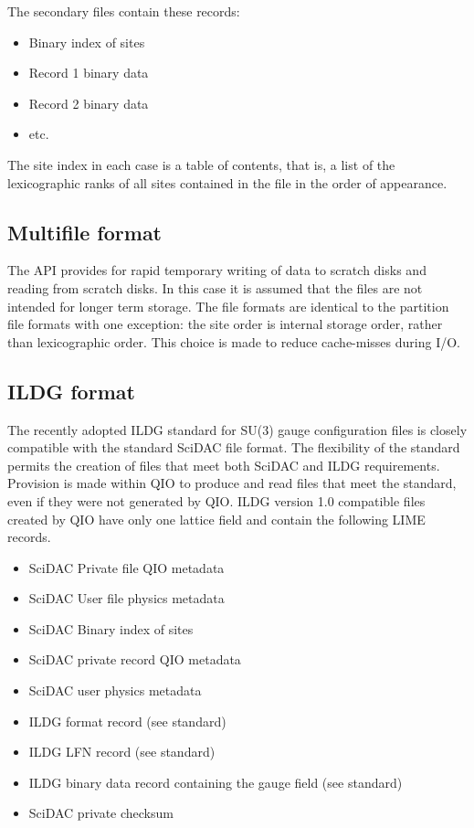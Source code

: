 \documentclass{article}
\begin{document}
The secondary files contain these records:

\begin{itemize}
  \item Binary index of sites
  \item Record 1 binary data
  \item Record 2 binary data
  \item etc.
\end{itemize}

The site index in each case is a table of contents, that is, a list of
the lexicographic ranks of all sites contained in the file in the
order of appearance.

\subsection{Multifile format}

The API provides for rapid temporary writing of data to scratch disks
and reading from scratch disks.  In this case it is assumed that the
files are not intended for longer term storage.  The file formats are
identical to the partition file formats with one exception: the site
order is internal storage order, rather than lexicographic order.
This choice is made to reduce cache-misses during I/O.

\subsection{ILDG format}

The recently adopted ILDG standard for SU(3) gauge configuration files
is closely compatible with the standard SciDAC file format.  The
flexibility of the standard permits the creation of files that meet
both SciDAC and ILDG requirements.  Provision is made within QIO to
produce and read files that meet the standard, even if they were not
generated by QIO.  ILDG version 1.0 compatible files created by QIO
have only one lattice field and contain the following LIME records.

\begin{itemize}
  \item SciDAC Private file QIO metadata
  \item SciDAC User file physics metadata
  \item SciDAC Binary index of sites
  \item SciDAC private record QIO metadata
  \item SciDAC user physics metadata
  \item ILDG format record (see standard)
  \item ILDG LFN record (see standard)
  \item ILDG binary data record containing the gauge field (see standard)
  \item SciDAC private checksum
\end{itemize}
\end{document}
